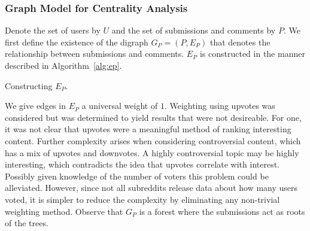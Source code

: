 \documentclass[letterpaper, 10 pt, conference]{ieeeconf}
\theoremstyle{definition}
\begin{document}
\subsubsection{Graph Model for Centrality Analysis}
Denote the set of users by \(U\) and the set of submissions and comments by \(P.\) We first define the existence of the digraph \(G_P=(P,E_P)\) that denotes the relationship between submissions and comments. \(E_P\) is constructed in the manner described in Algorithm~\ref{alg:ep}.
\begin{algorithm}
  \caption{Constructing \(E_P.\)}
  \label{alg:ep}
\end{algorithm}
We give edges in \(E_P\) a universal weight of \(1.\) Weighting using upvotes was considered but was determined to yield results that were not desireable. For one, it was not clear that upvotes were a meaningful method of ranking interesting content. Further complexity arises when considering controversial content, which has a mix of upvotes and downvotes. A highly controversial topic may be highly interesting, which contradicts the idea that upvotes correlate with interest. Possibly given knowledge of the number of voters this problem could be alleviated. However, since not all subreddits release data about how many users voted, it is simpler to reduce the complexity by eliminating any non-trivial weighting method. Observe that \(G_P\) is a forest where the submissions act as roots of the trees.
\end{document}
